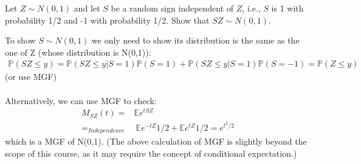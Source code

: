 

\setcounter{theorem}{29}
\begin{exercise}[BH.5.30] Let $Z \sim N(0,1)$ and let $S$ be a random sign independent of $Z$, i.e., $S$ is 1 with probability 1/2 and -1 with probability 1/2. Show that $SZ \sim N (0, 1)$.
\begin{solution}
    To show $S\sim N(0,1)$ we only need to show its distribution is the same as the one of Z (whose distribution is N(0,1)):
	\begin{align*}
		\mathbb{P}\left(SZ\leq y \right) = \mathbb{P}\left(SZ\leq y|S=1 \right)\mathbb{P}(S=1)+\mathbb{P}\left(SZ\leq y|S=1 \right)\mathbb{P}(S=-1) =\mathbb{P}\left(Z\leq y\right) 
	\end{align*}
	(or use MGF)
	\\~~\\
	Alternatively, we can use MGF to check:
	\begin{align*}
		M_{SZ}(t) =& \mathbb{E}e^{tSZ} \\
		=_{\textit{Independence}}&~ \mathbb{E}e^{-tZ} 1/2 + \mathbb{E}e^{tZ} 1/2 = e^{t^2/2} 
	\end{align*}
	which is a MGF of N(0,1). (The above calculation of MGF is slightly beyond the scope of this course, as it may require the concept of conditional expectation.)
\end{solution}
\end{exercise}


